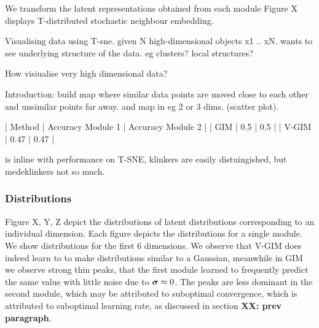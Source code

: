 	We transform the latent representations obtained from each module 
	Figure X displays 
		T-distributed stochastic neighbour embedding.
	
		Visualising data using T-sne.
			given N high-dimensional objects x1 .. xN. wants to see underlying structure of the data. eg clusters? local structures?
			
			How visiualise very high dimensional data?
			
			Introduction:
				build map where similar data points are moved close to each other and unsimilar points far away. and map in eg 2 or 3 dims. (scatter plot).
		
		
		
		
		
		
		
		| Method | Accuracy Module 1 | Accuracy Module 2 |
		| GIM	 | 0.5		| 0.5		|
		| V-GIM	 | 0.47		| 0.47		|
		
		is inline with performance on T-SNE, klinkers are easily distuingished, but medeklinkers not so much.
		
		
		
	\subsubsection{Distributions}
		Figure X, Y, Z depict the distributions of latent distributions corresponding to an individual dimension. Each figure depicts the distributions for a single module. We show distributions for the first 6 dimensions. We observe that V-GIM does indeed learn to to make distributions similar to a Gaussian, meanwhile in GIM we observe strong thin peaks, that the first module learned to frequently predict the same value with little noise due to $\bm{\sigma} \approx 0$. The peaks are less dominant in the second module, which may be attributed to suboptimal convergence, which is attributed to suboptimal learning rate, as discussed in section \textbf{XX: prev paragraph}.
		


